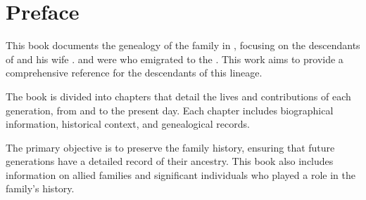 \chapter{Preface}
\label{preface}

This book documents the genealogy of the \mcdonald{} family in \southAfrica{}, focusing on the descendants of \mcdonaldJName{} and his wife \welchMName. \mcdonaldJNameOnly{} and \welchMNameOnly{} were \settlersBritish{} who emigrated to the \capeColony{}. This work aims to provide a comprehensive reference for the descendants of this lineage.

The book is divided into chapters that detail the lives and contributions of each generation, from \mcdonaldJNameOnly{} and \welchMNameOnly{} to the present day. Each chapter includes biographical information, historical context, and genealogical records.

The primary objective is to preserve the \mcdonald{} family history, ensuring that future generations have a detailed record of their ancestry. This book also includes information on allied families and significant individuals who played a role in the family's history.